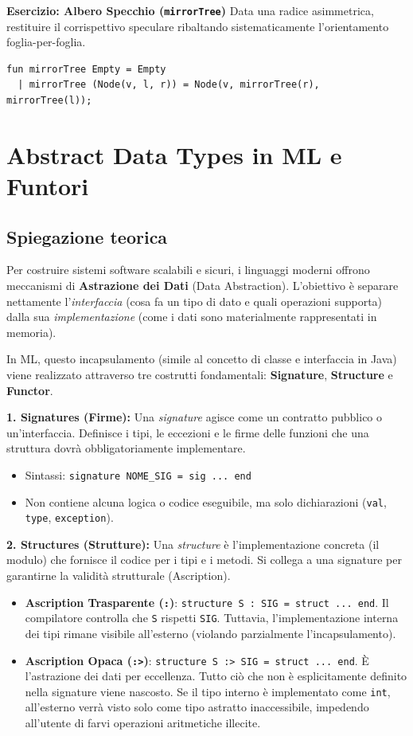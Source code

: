 \documentclass[12pt, a4paper]{article}
\begin{document}
\textbf{Esercizio: Albero Specchio (\texttt{mirrorTree})}
Data una radice asimmetrica, restituire il corrispettivo speculare ribaltando sistematicamente l'orientamento foglia-per-foglia.
\begin{verbatim}
fun mirrorTree Empty = Empty
  | mirrorTree (Node(v, l, r)) = Node(v, mirrorTree(r), mirrorTree(l));
\end{verbatim}

\section{Abstract Data Types in ML e Funtori}

\subsection{Spiegazione teorica}
Per costruire sistemi software scalabili e sicuri, i linguaggi moderni offrono meccanismi di \textbf{Astrazione dei Dati} (Data Abstraction). L'obiettivo è separare nettamente l'\textit{interfaccia} (cosa fa un tipo di dato e quali operazioni supporta) dalla sua \textit{implementazione} (come i dati sono materialmente rappresentati in memoria). 

In ML, questo incapsulamento (simile al concetto di classe e interfaccia in Java) viene realizzato attraverso tre costrutti fondamentali: \textbf{Signature}, \textbf{Structure} e \textbf{Functor}.

\textbf{1. Signatures (Firme):}
Una \textit{signature} agisce come un contratto pubblico o un'interfaccia. Definisce i tipi, le eccezioni e le firme delle funzioni che una struttura dovrà obbligatoriamente implementare.
\begin{itemize}
    \item Sintassi: \texttt{signature NOME\_SIG = sig ... end}
    \item Non contiene alcuna logica o codice eseguibile, ma solo dichiarazioni (\texttt{val}, \texttt{type}, \texttt{exception}).
\end{itemize}

\textbf{2. Structures (Strutture):}
Una \textit{structure} è l'implementazione concreta (il modulo) che fornisce il codice per i tipi e i metodi. Si collega a una signature per garantirne la validità strutturale (Ascription).
\begin{itemize}
    \item \textbf{Ascription Trasparente (\texttt{:})}: \texttt{structure S : SIG = struct ... end}. Il compilatore controlla che \texttt{S} rispetti \texttt{SIG}. Tuttavia, l'implementazione interna dei tipi rimane visibile all'esterno (violando parzialmente l'incapsulamento).
    \item \textbf{Ascription Opaca (\texttt{:>})}: \texttt{structure S :> SIG = struct ... end}. È l'astrazione dei dati per eccellenza. Tutto ciò che non è esplicitamente definito nella signature viene nascosto. Se il tipo interno è implementato come \texttt{int}, all'esterno verrà visto solo come tipo astratto inaccessibile, impedendo all'utente di farvi operazioni aritmetiche illecite.
\end{itemize}
\end{document}
